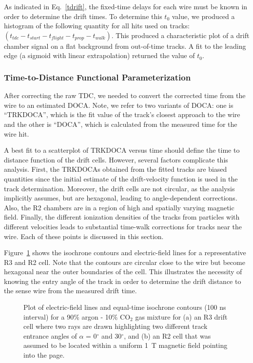 As indicated in Eq.~\ref{tdrift}, the fixed-time delays 
for each wire must be known in order to determine the drift times.   To determine
this $t_0$ value, we produced a histogram of the following quantity for all hits
used on tracks:~$ ( t_{tdc} - t_{start} - t_{flight} - t_{prop} - t_{walk} )$.
This produced a characteristic plot of a drift chamber signal on a flat
background from out-of-time tracks.  
A fit to the leading edge (a sigmoid with linear extrapolation) returned the value of $t_0$.

\subsubsection{Time-to-Distance Functional Parameterization}
\label{tdistcal}

After correcting the raw TDC, we needed to convert the corrected time from
the wire to an estimated DOCA.
Note, we refer to two variants of DOCA: one is ``TRKDOCA'', which is the
fit value of the track's closest approach to the wire and the other is ``DOCA'',
which is calculated from the measured time for the wire hit.
 
A best fit to a scatterplot of TRKDOCA versus time should define the time to
distance function of the drift cells. However, several factors 
complicate this analysis. First, the TRKDOCAs obtained from the fitted 
tracks are biased quantities since the initial estimate of the drift-velocity function 
is used in the track determination.  Moreover, the drift cells are 
not circular, as the analysis implicitly assumes, but are hexagonal, leading 
to angle-dependent corrections. Also, the R2 chambers are in a 
region of high and spatially varying magnetic field. Finally, the different 
ionization densities of the tracks from particles with different velocities 
leads to substantial time-walk corrections for tracks near the wire.  Each of 
these points is discussed in this section.

Figure~\ref{garfield-isochrones} shows the isochrone contours and electric-field lines for 
a representative R3 and R2 cell.  Note that the contours are circular close 
to the wire but become hexagonal near the outer boundaries of the cell.  This 
illustrates the necessity of knowing the entry angle of the track in order to 
determine the drift distance to the sense wire from the measured drift time.

\begin{figure}[htpb]
\vspace{6.5cm} 
\caption{\small{Plot of electric-field lines and equal-time isochrone contours
(100 ns interval) for a 90$\%$ argon - 10$\%$ CO$_2$ gas mixture for (a) an R3
drift cell where two rays are drawn highlighting two different track entrance 
angles of $\alpha$ = 0$^{\circ}$ and 30$^{\circ}$, and (b) an R2 cell that 
was assumed to be located within a uniform 1~T magnetic field pointing into the page.}}
\label{garfield-isochrones}
\end{figure}

